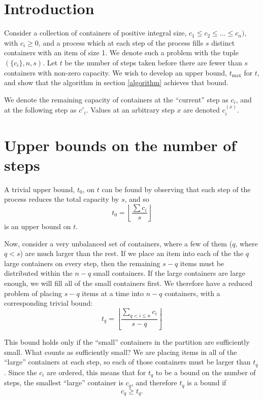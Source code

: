 \documentclass[a4paper,10pt]{article}
\begin{document}
\section{Introduction}

Consider a collection of containers of positive integral size, $c_1
\le c_2 \le \ldots \le c_n)$, with $c_i \ge 0$, and a process which at
each step of the process fills $s$ distinct containers with an item of
size 1. We denote such a problem with the tuple $(\{c_i\}, n, s)$. Let
$t$ be the number of steps taken before there are fewer than $s$
containers with non-zero capacity. We wish to develop an upper bound,
$t_{\max}$ for $t$, and show that the algorithm in section
\ref{algorithm} achieves that bound.

We denote the remaining capacity of containers at the ``current'' step
as $c_i$, and at the following step as $c'_i$. Values at an arbitrary
step $x$ are denoted $c_i^{(x)}$.

\section{Upper bounds on the number of steps}

A trivial upper bound, $t_0$, on $t$ can be found by observing that
each step of the process reduces the total capacity by $s$, and so
\begin{equation}
  \label{t0-bound}
  t_0 = \left\lfloor \frac{\sum c_i}{s} \right\rfloor
\end{equation}
is an upper bound on $t$.

Now, consider a very unbalanced set of containers, where a few of them
($q$, where $q < s$) are much larger than the rest. If we place an
item into each of the the $q$ large containers on every step, then the
remaining $s-q$ items must be distributed within the $n-q$ small
containers. If the large containers are large enough, we will fill all
of the small containers first. We therefore have a reduced problem of
placing $s-q$ items at a time into $n-q$ containers, with a
corresponding trivial bound:
\begin{equation}
  \label{tq-bound}
  t_q = \left\lfloor \frac{\sum_{q<i \le n} c_i}{s-q} \right\rfloor
\end{equation}

This bound holds only if the ``small'' containers in the partition are
sufficiently small. What counts as sufficiently small? We are placing
items in all of the ``large'' containers at each step, so each of
those containers must be larger than $t_q$. Since the $c_i$ are
ordered, this means that for $t_q$ to be a bound on the number of
steps, the smallest ``large'' container is $c_q$, and therefore $t_q$
is a bound if
\begin{equation}
  \label{tq-condition}
  c_q \ge t_q.
\end{equation}
\end{document}
